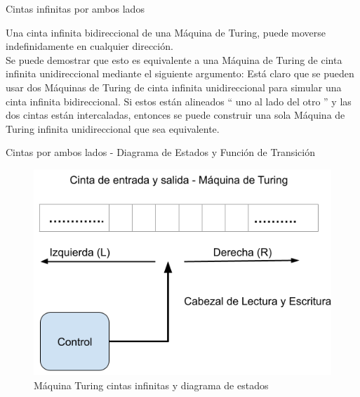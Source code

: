 \documentclass[11pt]{beamer}
\begin{document}
	\begin{frame}{Cintas infinitas por ambos lados}
			\justifying
			
				Una cinta infinita bidireccional de una Máquina de Turing, puede moverse indefinidamente en cualquier dirección. \\
				
				Se puede demostrar que esto es equivalente a una Máquina de Turing de cinta infinita unidireccional mediante el siguiente argumento: Está claro que se pueden usar dos Máquinas de Turing de cinta infinita unidireccional para simular una cinta infinita bidireccional. Si estos están alineados `` uno al lado del otro '' y las dos cintas están intercaladas, entonces se puede construir una sola Máquina de Turing infinita unidireccional que sea equivalente.
	
	
		\end{frame}
		
	    \begin{frame}{Cintas por ambos lados - Diagrama de Estados y Función de Transición}
			\justifying
			
			\begin{figure}[H]
				\centering
				\includegraphics[scale=0.35]{img/infiniteside.png}
				\caption{Máquina Turing cintas infinitas y diagrama de estados}
				\label{fig: InfiniteSide}
			\end{figure}
			
		\end{frame}
	

	
\end{document}
